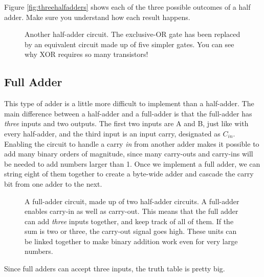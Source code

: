 Figure \ref{fig:threehalfadders} shows each of the three possible outcomes of a half adder. Make sure you understand how each result happens.

\begin{figure}[!hb]
\begin{center}



\caption{Another half-adder circuit. The exclusive-OR gate has been replaced by an equivalent circuit made up of five simpler gates. You can see why XOR requires so many transistors!}
\end{center}
\end{figure}



\clearpage

\subsection*{Full Adder}

This type of adder is a little more difficult to implement than a half-adder. The main difference between a half-adder and a full-adder is that the full-adder has \emph{three} inputs and two outputs. The first two inputs are A and B, just like with every half-adder, and the third input is an input carry, designated as $C_{in}$. Enabling the circuit to handle a carry \emph{in} from another adder makes it possible to add many binary orders of magnitude, since many carry-outs and carry-ins will be needed to add numbers larger than 1. Once we implement a full adder, we can string eight of them together to create a byte-wide adder and cascade the carry bit from one adder to the next.
\bigskip

\begin{figure}[!hb]
\begin{center}

\caption{A full-adder circuit, made up of two half-adder circuits. A full-adder enables carry-in as well as carry-out. This means that the full adder can add \emph{three} inputs together, and keep track of all of them. If the sum is two or three, the carry-out signal goes high. These units can be linked together to make binary addition work even for very large numbers.}
\end{center}
\end{figure}

Since full adders can accept three inputs, the truth table is pretty big.

